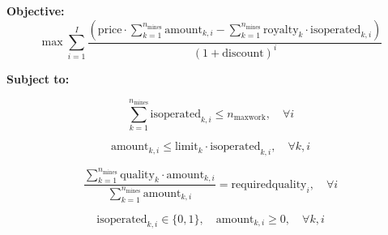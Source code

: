 \documentclass{article}
\begin{document}
\textbf{Objective:}
\[
\max \sum_{i=1}^{I} \frac{\left(\text{price} \cdot \sum_{k=1}^{n_{\text{mines}}} \text{amount}_{k, i} - \sum_{k=1}^{n_{\text{mines}}} \text{royalty}_{k} \cdot \text{isoperated}_{k, i}\right)}{(1 + \text{discount})^i}
\]

\textbf{Subject to:}

\[
\sum_{k=1}^{n_{\text{mines}}} \text{isoperated}_{k, i} \leq n_{\text{maxwork}}, \quad \forall i
\]

\[
\text{amount}_{k, i} \leq \text{limit}_{k} \cdot \text{isoperated}_{k, i}, \quad \forall k, i
\]

\[
\frac{\sum_{k=1}^{n_{\text{mines}}} \text{quality}_{k} \cdot \text{amount}_{k, i}}{\sum_{k=1}^{n_{\text{mines}}} \text{amount}_{k, i}} = \text{requiredquality}_{i}, \quad \forall i
\]

\[
\text{isoperated}_{k, i} \in \{0, 1\}, \quad \text{amount}_{k, i} \geq 0, \quad \forall k, i
\]
\end{document}
